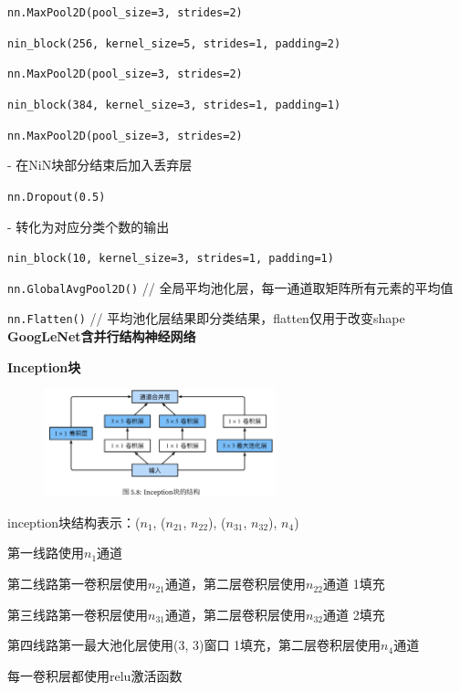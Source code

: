 \documentclass[UTF8]{ctexart}
\begin{document}
  \quad \texttt{nn.MaxPool2D(pool\_size=3, strides=2)}

  \quad \texttt{nin\_block(256, kernel\_size=5, strides=1, padding=2)}

  \quad \texttt{nn.MaxPool2D(pool\_size=3, strides=2)}

  \quad \texttt{nin\_block(384, kernel\_size=3, strides=1, padding=1)}

  \quad \texttt{nn.MaxPool2D(pool\_size=3, strides=2)}

  \quad - 在NiN块部分结束后加入丢弃层

  \quad \texttt{nn.Dropout(0.5)}

  \quad - 转化为对应分类个数的输出

  \quad \texttt{nin\_block(10, kernel\_size=3, strides=1, padding=1)}

  \quad \texttt{nn.GlobalAvgPool2D()} // 全局平均池化层，每一通道取矩阵所有元素的平均值

  \quad \texttt{nn.Flatten()} // 平均池化层结果即分类结果，flatten仅用于改变shape\\
\textbf{GoogLeNet含并行结构神经网络}

  \textbf{Inception块}
  \begin{figure}[H] %
    \centering %
    \includegraphics[width=0.6\textwidth]{note_images/inception_block.png} %
  \end{figure}

  \quad inception块结构表示：($n_1$, ($n_{21}$, $n_{22}$), ($n_{31}$, $n_{32}$), $n_4$) 
  
  \quad \quad 第一线路使用$n_1$通道
 
  \quad \quad 第二线路第一卷积层使用$n_{21}$通道，第二层卷积层使用$n_{22}$通道 1填充
 
  \quad \quad 第三线路第一卷积层使用$n_{31}$通道，第二层卷积层使用$n_{32}$通道 2填充
  
  \quad \quad 第四线路第一最大池化层使用(3, 3)窗口 1填充，第二层卷积层使用$n_4$通道

  \quad 每一卷积层都使用relu激活函数
\end{document}
